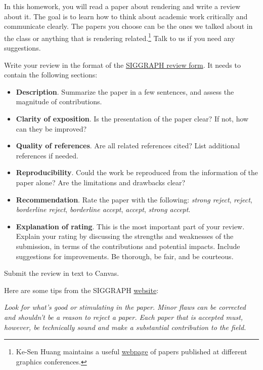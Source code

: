 




In this homework, you will read a paper about rendering and write a review about it. The goal is to learn how to think about academic work critically and communicate clearly. The papers you choose can be the ones we talked about in the class or anything that is rendering related.\footnote{Ke-Sen Huang maintains a useful \href{http://kesen.realtimerendering.com/}{webpage} of papers published at different graphics conferences.} Talk to us if you need any suggestions.

Write your review in the format of the \href{https://sa2020.siggraph.org/en/submissions/technical-papers/review-form}{SIGGRAPH review form}. It needs to contain the following sections:
\begin{itemize}
	\item \textbf{Description}. Summarize the paper in a few sentences, and assess the magnitude of contributions.
	\item \textbf{Clarity of exposition}. Is the presentation of the paper clear? If not, how can they be improved?
	\item \textbf{Quality of references}. Are all related references cited? List additional references if needed.
	\item \textbf{Reproducibility}. Could the work be reproduced from the information of the paper alone? Are the limitations and drawbacks clear?
	\item \textbf{Recommendation}. Rate the paper with the following: \emph{strong reject}, \emph{reject}, \emph{borderline reject}, \emph{borderline accept}, \emph{accept}, \emph{strong accept}.
	\item \textbf{Explanation of rating}. This is the most important part of your review. Explain your rating by discussing the strengths and weaknesses of the submission, in terms of the contributions and potential impacts. Include suggestions for improvements. Be thorough, be fair, and be courteous.
\end{itemize}

Submit the review in text to Canvas.

Here are some tips from the SIGGRAPH \href{https://sa2020.siggraph.org/en/submissions/technical-papers/reviewer-instructions}{website}:

\textit{Look for what's good or stimulating in the paper. Minor flaws can be corrected and shouldn't be a reason to reject a paper. Each paper that is accepted must, however, be technically sound and make a substantial contribution to the field.}

